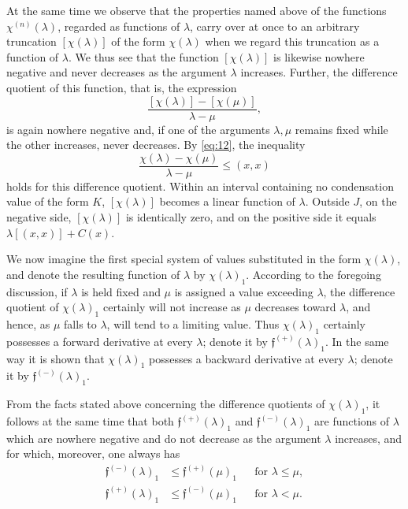 \documentclass[b5paper,twoside]{article}
\newcommand{\originalpage}[1]{\phantomsection\label{origpage:#1}}
\begin{document}
At the same time we observe that the properties named above of the functions
$\chi^{(n)}(\lambda)$, regarded as functions of $\lambda$, carry over at once
to an arbitrary truncation $[\chi(\lambda)]$ of the form $\chi(\lambda)$ when
we regard this truncation as a function of $\lambda$.  We thus see that the
function $[\chi(\lambda)]$ is likewise nowhere negative and never decreases
as the argument $\lambda$ increases.  Further, the difference quotient of
this function, that is, the expression
\[
  \frac{[\chi(\lambda)]-[\chi(\mu)]}{\lambda-\mu},
\]
is again nowhere negative and, if one of the arguments $\lambda,\mu$ remains
fixed while the other increases, never decreases.  By \eqref{eq:12}, the
inequality
\begin{equation}
\tag{19}\label{eq:19}
  \frac{\chi(\lambda)-\chi(\mu)}{\lambda-\mu}\le(x,x)
\end{equation}
holds for this difference quotient.  Within an interval containing no
condensation value of the form $K$, $[\chi(\lambda)]$ becomes a linear
function of $\lambda$.  Outside $J$,\originalpage{168} on the negative side,
$[\chi(\lambda)]$ is identically zero, and on the positive side it equals
$\lambda[(x,x)]+C(x)$.

We now imagine the first special system of values substituted in the form
$\chi(\lambda)$, and denote the resulting function of $\lambda$ by
$\chi(\lambda)_1$.  According to the foregoing discussion, if $\lambda$ is
held fixed and $\mu$ is assigned a value exceeding $\lambda$, the difference
quotient of $\chi(\lambda)_1$ certainly will not increase as $\mu$ decreases
toward $\lambda$, and hence, as $\mu$ falls to $\lambda$, will tend to a
limiting value.  Thus $\chi(\lambda)_1$ certainly possesses a forward
derivative at every $\lambda$; denote it by
$\mathfrak f^{(+)}(\lambda)_1$.  In the same way it is shown that
$\chi(\lambda)_1$ possesses a backward derivative at every $\lambda$; denote
it by $\mathfrak f^{(-)}(\lambda)_1$.

From the facts stated above concerning the difference quotients of
$\chi(\lambda)_1$, it follows at the same time that both
$\mathfrak f^{(+)}(\lambda)_1$ and $\mathfrak f^{(-)}(\lambda)_1$ are
functions of $\lambda$ which are nowhere negative and do not decrease as the
argument $\lambda$ increases, and for which, moreover, one always has
\begin{equation}
\tag{20}\label{eq:20}
\begin{aligned}
  \mathfrak f^{(-)}(\lambda)_1
    &\le\mathfrak f^{(+)}(\mu)_1 &&\text{for }\lambda\le\mu,\\
  \mathfrak f^{(+)}(\lambda)_1
    &\le\mathfrak f^{(-)}(\mu)_1 &&\text{for }\lambda<\mu.
\end{aligned}
\end{equation}
\end{document}
